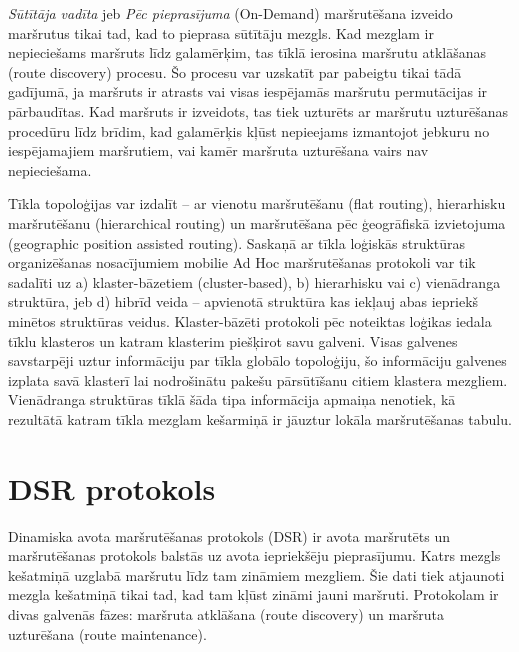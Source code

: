 \textit{Sūtītāja vadīta} jeb \textit{Pēc pieprasījuma} (On-Demand) maršrutēšana izveido maršrutus tikai tad, kad to pieprasa sūtītāju mezgls. Kad mezglam ir nepieciešams maršruts līdz galamērķim, tas tīklā ierosina maršrutu atklāšanas (route discovery) procesu. Šo procesu var uzskatīt par pabeigtu tikai tādā gadījumā, ja maršruts ir atrasts vai visas iespējamās maršrutu permutācijas ir pārbaudītas.  Kad maršruts ir izveidots, tas tiek uzturēts ar maršrutu uzturēšanas procedūru līdz brīdim, kad galamērķis kļūst nepieejams izmantojot jebkuru no iespējamajiem maršrutiem, vai kamēr maršruta uzturēšana vairs nav nepieciešama.

Tīkla topoloģijas var izdalīt – ar vienotu maršrutēšanu (flat routing), hierarhisku maršrutēšanu (hierarchical routing) un maršrutēšana pēc ģeogrāfiskā izvietojuma (geographic position assisted routing)\cite{hong}. Saskaņā ar tīkla loģiskās struktūras organizēšanas nosacījumiem mobilie Ad Hoc maršrutēšanas protokoli var tik sadalīti uz a) klaster-bāzetiem (cluster-based), b) hierarhisku vai c) vienādranga struktūra, jeb d) hibrīd veida – apvienotā struktūra kas iekļauj abas iepriekš minētos struktūras veidus. Klaster-bāzēti protokoli pēc noteiktas loģikas iedala tīklu klasteros un katram klasterim piešķirot savu galveni. Visas galvenes savstarpēji uztur informāciju par tīkla globālo topoloģiju, šo informāciju galvenes izplata savā klasterī lai nodrošinātu pakešu pārsūtīšanu citiem klastera mezgliem. Vienādranga struktūras tīklā šāda tipa informācija apmaiņa nenotiek, kā rezultātā katram tīkla mezglam kešarmiņā ir jāuztur lokāla maršrutēšanas tabulu.



\section{DSR protokols}\label{sec:dsr}
Dinamiska avota maršrutēšanas protokols (\acs{DSR}) ir avota maršrutēts un maršrutēšanas protokols balstās uz avota iepriekšēju pieprasījumu.  Katrs mezgls kešatmiņā uzglabā maršrutu līdz tam zināmiem mezgliem. Šie dati tiek atjaunoti mezgla kešatmiņā tikai tad, kad tam kļūst zināmi jauni maršruti. Protokolam ir divas galvenās fāzes: maršruta atklāšana (route discovery) un maršruta uzturēšana (route maintenance).

